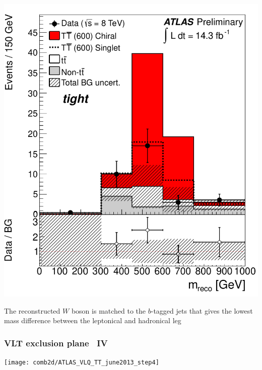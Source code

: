 \documentclass[xcolor=dvipsnames,10pt]{beamer}
\begin{document}
\begin{frame}
\begin{minipage}{.35\textwidth}
      \includegraphics[width=1.\textwidth]{wbx/fig_06b.pdf}

The reconstructed $W$ boson is matched to the $b$-tagged jets that gives the lowest mass difference between the leptonical and hadronical leg
    \end{minipage}

\end{frame}

\begin{frame}\frametitle{VLT exclusion plane~\cite{combination} IV}
\footnotesize\centering

\texttt{[image: comb2d/ATLAS\_VLQ\_TT\_june2013\_step4]}

\end{frame}



\end{document}
